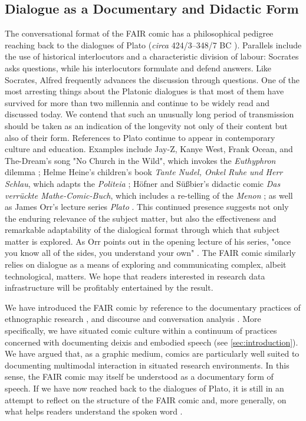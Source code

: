 \documentclass{inggrid}
\begin{document}
\subsection{Dialogue as a Documentary and Didactic Form}
The conversational format of the FAIR comic has a philosophical pedigree reaching back to the dialogues of Plato (\textit{circa} 424/3--348/7 BC \cite{debra_people_2002}). Parallels include the use of historical interlocutors \cite{debra_people_2002} and a characteristic division of labour: Socrates asks questions, while his interlocutors formulate and defend answers. Like Socrates, Alfred frequently advances the discussion through questions. One of the most arresting things about the Platonic dialogues is that most of them have survived for more than two millennia and continue to be widely read and discussed today. We contend that such an unusually long period of transmission should be taken as an indication of the longevity not only of their content but also of their form. References to Plato continue to appear in contemporary culture and education. Examples include Jay-Z, Kanye West, Frank Ocean, and The-Dream's song "No Church in the Wild", which invokes the \textit{Euthyphron} dilemma \cite{jay-z_no_2011, kanye_west_jay-z_2012}; Helme Heine's children’s book \textit{Tante Nudel, Onkel Ruhe und Herr Schlau}, which adapts the \textit{Politeia} \cite{heine_1979}; Höfner and Süßbier's didactic comic \textit{Das verrückte Mathe-Comic-Buch}, which includes a re-telling of the \textit{Menon} \cite{hofner_verruckte_2012}; as well as James Orr's lecture series \textit{Plato} \cite{peterson_academy_dr_2026}. This continued presence suggests not only the enduring relevance of the subject matter, but also the effectiveness and remarkable adaptability of the dialogical format through which that subject matter is explored. As Orr points out in the opening lecture of his series, "once you know all of the sides, you understand your own" \parencite[at 55:09]{peterson_academy_dr_2026}. The FAIR comic similarly relies on dialogue as a means of exploring and communicating complex, albeit technological, matters. We hope that readers interested in research data infrastructure will be profitably entertained by the result.

We have introduced the FAIR comic by reference to the documentary practices of ethnographic research \cite{latour_laboratory_1979, latour_laboratory_1986}, and discourse and conversation analysis \cite{edwards_common_1987, hormeyer_einsatz_2015}. More specifically, we have situated comic culture within a continuum of practices concerned with documenting deixis and embodied speech (see \ref{sec:introduction}). We have argued that, as a graphic medium, comics are particularly well suited to documenting multimodal interaction in situated research environments. In this sense, the FAIR comic may itself be understood as a documentary form of speech. If we have now reached back to the dialogues of Plato, it is still in an attempt to reflect on the structure of the FAIR comic and, more generally, on what helps readers understand the spoken word \cite{ong_orality_1982}.
\end{document}
